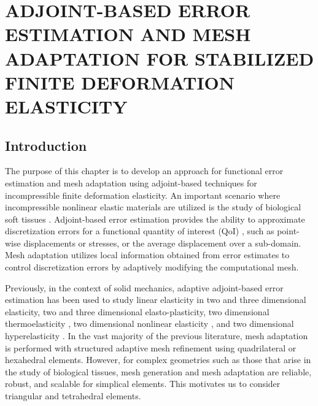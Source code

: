 \chapter{ADJOINT-BASED ERROR ESTIMATION AND MESH ADAPTATION
FOR STABILIZED FINITE DEFORMATION ELASTICITY}
\label{chap:mech}


\section{Introduction}

The purpose of this chapter is to develop an approach for functional error
estimation and mesh adaptation using adjoint-based techniques for
incompressible finite deformation elasticity. An important scenario where
incompressible nonlinear elastic materials are utilized is the study of
biological soft tissues \cite{legant2010measurement, paszek2005tensional,
discher2005tissue}. Adjoint-based error estimation provides the ability
to approximate discretization errors for a functional quantity of interest
(QoI) \cite{venditti2000adjoint, becker2001optimal, giles2002adjoint,
peraire1998bounds, prudhomme1999goal, braack2003posteriori,
bangerth2013adaptive}, such as point-wise displacements or stresses, or the
average displacement over a sub-domain. Mesh adaptation utilizes local
information obtained from error estimates to control discretization
errors by adaptively modifying the computational mesh.

Previously, in the context of solid mechanics, adaptive adjoint-based error
estimation has been used to study linear elasticity in two
\cite{rannacher1997feed, stein2007error, gonzalez2014mesh} and three
\cite{ghorashi2014goal} dimensional elasticity, two
\cite{rannacher1998posteriori, rannacher1999posteriori} and three
\cite{ghorashi2017goal} dimensional elasto-plasticity, two dimensional
thermoelasticity \cite{rabizadeh2015adaptive}, two dimensional nonlinear
elasticity \cite{larsson2002strategies}, and two dimensional
hyperelasticity \cite{whiteley2014error}. In the vast majority of the
previous literature, mesh adaptation is performed with structured adaptive
mesh refinement using quadrilateral or hexahedral elements. However, for
complex geometries such as those that arise in the study of biological
tissues, mesh generation and mesh adaptation are reliable, robust, and
scalable for simplical elements. This motivates us to consider triangular and
tetrahedral elements.

